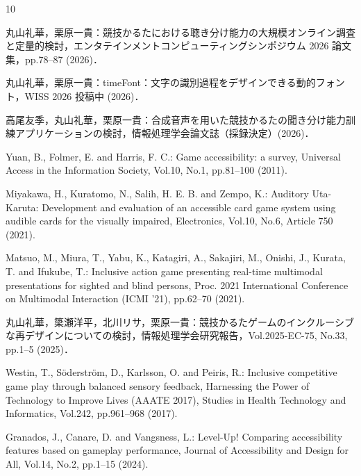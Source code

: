 \begin{thebibliography}{10}

丸山礼華，栗原一貴：競技かるたにおける聴き分け能力の大規模オンライン調査と定量的検討，エンタテインメントコンピューティングシンポジウム 2026 論文集，pp.78--87 (2026)．

丸山礼華，栗原一貴：timeFont：文字の識別過程をデザインできる動的フォント，WISS 2026 投稿中 (2026)．

高尾友季，丸山礼華，栗原一貴：合成音声を用いた競技かるたの聞き分け能力訓練アプリケーションの検討，情報処理学会論文誌（採録決定）(2026)．

Yuan, B., Folmer, E. and Harris, F. C.: Game accessibility: a survey, Universal Access in the Information Society, Vol.10, No.1, pp.81--100 (2011).

Miyakawa, H., Kuratomo, N., Salih, H. E. B. and Zempo, K.: Auditory Uta-Karuta: Development and evaluation of an accessible card game system using audible cards for the visually impaired, Electronics, Vol.10, No.6, Article 750 (2021).

Matsuo, M., Miura, T., Yabu, K., Katagiri, A., Sakajiri, M., Onishi, J., Kurata, T. and Ifukube, T.: Inclusive action game presenting real-time multimodal presentations for sighted and blind persons, Proc. 2021 International Conference on Multimodal Interaction (ICMI '21), pp.62--70 (2021).

丸山礼華，簗瀬洋平，北川リサ，栗原一貴：競技かるたゲームのインクルーシブな再デザインについての検討，情報処理学会研究報告，Vol.2025-EC-75, No.33, pp.1--5 (2025)．

Westin, T., S\"{o}derstr\"{o}m, D., Karlsson, O. and Peiris, R.: Inclusive competitive game play through balanced sensory feedback, Harnessing the Power of Technology to Improve Lives (AAATE 2017), Studies in Health Technology and Informatics, Vol.242, pp.961--968 (2017).

Granados, J., Canare, D. and Vangsness, L.: Level-Up! Comparing accessibility features based on gameplay performance, Journal of Accessibility and Design for All, Vol.14, No.2, pp.1--15 (2024).


\end{thebibliography}
